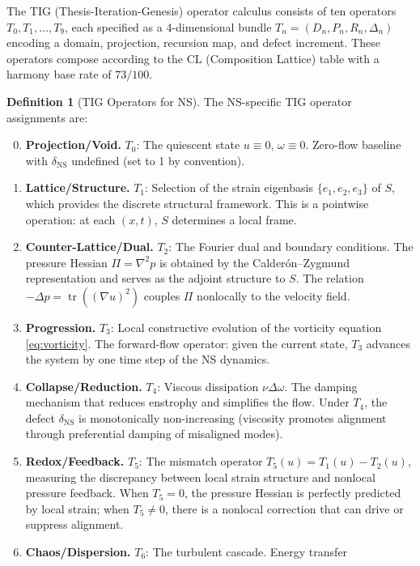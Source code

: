 \documentclass[11pt]{article}
\theoremstyle{definition}
\newtheorem{definition}[theorem]{Definition}
\theoremstyle{remark}
\DeclareMathOperator{\tr}{tr}
\begin{document}
The TIG (Thesis-Iteration-Genesis) operator calculus consists of ten operators
$T_0, T_1, \ldots, T_9$, each specified as a 4-dimensional bundle
$T_n = (D_n, P_n, R_n, \Delta_n)$ encoding a domain, projection, recursion map,
and defect increment.  These operators compose according to the CL (Composition
Lattice) table with a harmony base rate of $73/100$.

\begin{definition}[TIG Operators for NS]
\label{def:TIG}
The NS-specific TIG operator assignments are:
\begin{enumerate}[nosep,label=\textbf{T\arabic*}:]
  \setcounter{enumi}{-1}
  \item \textbf{Projection/Void.}  $T_0$: The quiescent state $u \equiv 0$,
    $\omega \equiv 0$.  Zero-flow baseline with $\delta_{\mathrm{NS}}$ undefined
    (set to 1 by convention).
  \item \textbf{Lattice/Structure.}  $T_1$: Selection of the strain eigenbasis
    $\{e_1, e_2, e_3\}$ of $S$, which provides the discrete structural framework.
    This is a pointwise operation: at each $(x,t)$, $S$ determines a local frame.
  \item \textbf{Counter-Lattice/Dual.}  $T_2$: The Fourier dual and boundary
    conditions.  The pressure Hessian $\Pi = \nabla^2 p$ is obtained by the
    Calder\'on--Zygmund representation and serves as the adjoint structure to $S$.
    The relation $-\Delta p = \tr((\nabla u)^2)$ couples $\Pi$ nonlocally to the
    velocity field.
  \item \textbf{Progression.}  $T_3$: Local constructive evolution of the vorticity
    equation \eqref{eq:vorticity}.  The forward-flow operator: given the current
    state, $T_3$ advances the system by one time step of the NS dynamics.
  \item \textbf{Collapse/Reduction.}  $T_4$: Viscous dissipation $\nu\Delta\omega$.
    The damping mechanism that reduces enstrophy and simplifies the flow.
    Under $T_4$, the defect $\delta_{\mathrm{NS}}$ is monotonically non-increasing
    (viscosity promotes alignment through preferential damping of misaligned modes).
  \item \textbf{Redox/Feedback.}  $T_5$: The mismatch operator
    $T_5(u) = T_1(u) - T_2(u)$, measuring the discrepancy between local strain
    structure and nonlocal pressure feedback.  When $T_5 = 0$, the pressure
    Hessian is perfectly predicted by local strain; when $T_5 \neq 0$, there is
    a nonlocal correction that can drive or suppress alignment.
  \item \textbf{Chaos/Dispersion.}  $T_6$: The turbulent cascade.  Energy transfer

\end{enumerate}
\end{definition}
\end{document}
